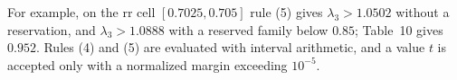 For example, on the $\mathrm{rr}$ cell $[0.7025,0.705]$ rule (5) gives $\lambda_3>1.0502$ without a
reservation, and $\lambda_3>1.0888$ with a reserved family below $0.85$; Table~10 gives $0.952$.
Rules (4) and (5) are evaluated with interval arithmetic, and a value $t$ is accepted only with a
normalized margin exceeding $10^{-5}$.
